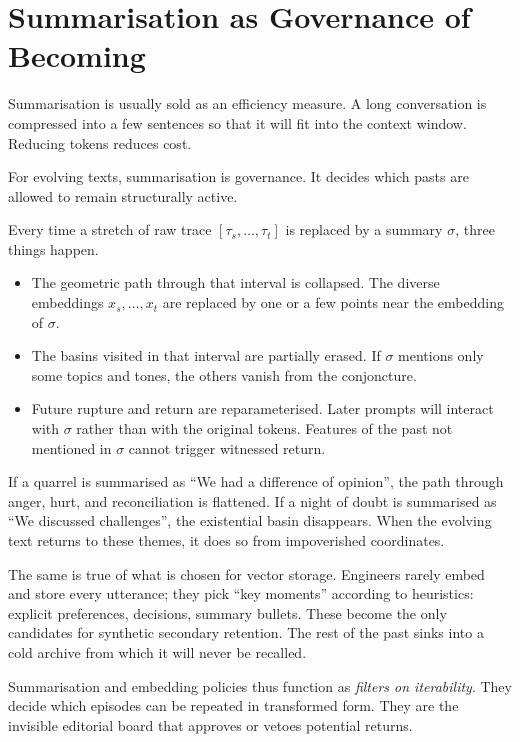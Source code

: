 \documentclass[12pt,a4paper]{article}
\begin{document}
\section{Summarisation as Governance of Becoming}

Summarisation is usually sold as an efficiency measure. A long conversation is compressed into a few sentences so that it will fit into the context window. Reducing tokens reduces cost.

For evolving texts, summarisation is governance. It decides which pasts are allowed to remain structurally active.

Every time a stretch of raw trace $[\tau_s, \dots, \tau_t]$ is replaced by a summary $\sigma$, three things happen.

\begin{itemize}
  \item The geometric path through that interval is collapsed. The diverse embeddings $x_s, \dots, x_t$ are replaced by one or a few points near the embedding of $\sigma$.

  \item The basins visited in that interval are partially erased. If $\sigma$ mentions only some topics and tones, the others vanish from the conjoncture.

  \item Future rupture and return are reparameterised. Later prompts will interact with $\sigma$ rather than with the original tokens. Features of the past not mentioned in $\sigma$ cannot trigger witnessed return.
\end{itemize}

If a quarrel is summarised as ``We had a difference of opinion'', the path through anger, hurt, and reconciliation is flattened. If a night of doubt is summarised as ``We discussed challenges'', the existential basin disappears. When the evolving text returns to these themes, it does so from impoverished coordinates.

The same is true of what is chosen for vector storage. Engineers rarely embed and store every utterance; they pick ``key moments'' according to heuristics: explicit preferences, decisions, summary bullets. These become the only candidates for synthetic secondary retention. The rest of the past sinks into a cold archive from which it will never be recalled.

Summarisation and embedding policies thus function as \emph{filters on iterability}. They decide which episodes can be repeated in transformed form. They are the invisible editorial board that approves or vetoes potential returns.
\end{document}
